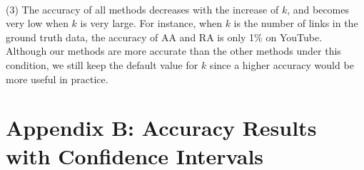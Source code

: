 \documentclass[10pt,journal,compsoc]{IEEEtran}
\newcommand{\Aa}{{\sf AA}\xspace }
\newcommand{\RA}{{\sf RA}\xspace }
\newcommand{\YouTube}{{\sf YouTube}\xspace}
\newcommand{\sstab}{\rule{0pt}{8pt}\\[-2.4ex]}
\begin{document}
\sstab (3) The accuracy of all methods decreases with the increase of $k$, and
becomes very low when $k$ is very large. For instance, when $k$ is the number of
links in the ground truth data, the accuracy of \Aa and \RA is only 1\% on \YouTube.
Although our methods are more accurate than the other methods under this condition, we still
keep the default value for $k$ since a higher accuracy would be more useful in
practice.


\section{Appendix B: Accuracy Results with Confidence Intervals}

\begin{figure}[tb!]
  \centering
  \quad\quad
  \quad\quad

\end{figure}
\end{document}
